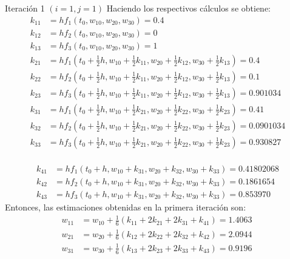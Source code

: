 \begin{frame}{Iteración 1 $(i=1, j=1)$}
Haciendo los respectivos cálculos se obtiene:
\begin{align*}
k_{11} &= hf_1(t_0, w_{10}, w_{20}, w_{30})=0.4\\
k_{12} &= hf_2(t_0, w_{10}, w_{20}, w_{30})=0\\
k_{13} &= hf_3(t_0, w_{10}, w_{20}, w_{30})=1\\
k_{21} &=hf_1(t_0 +\frac{1}{2}h, w_{10}+\frac{1}{2}k_{11}, w_{20}+\frac{1}{2}k_{12}, w_{30}+\frac{1}{2}k_{13})=0.4\\
k_{22} &=hf_2(t_0 +\frac{1}{2}h, w_{10}+\frac{1}{2}k_{11}, w_{20}+\frac{1}{2}k_{12}, w_{30}+\frac{1}{2}k_{13})=0.1\\
k_{23} &=hf_3(t_0 +\frac{1}{2}h, w_{10}+\frac{1}{2}k_{11}, w_{20}+\frac{1}{2}k_{12}, w_{30}+\frac{1}{2}k_{13})=0.901034\\
k_{31}&=hf_1(t_0+\frac{1}{2}h, w_{10}+\frac{1}{2}k_{21}, w_{20}+\frac{1}{2}k_{22}, w_{30}+\frac{1}{2}k_{23})=0.41\\
k_{32}&=hf_2(t_0+\frac{1}{2}h, w_{10}+\frac{1}{2}k_{21}, w_{20}+\frac{1}{2}k_{22}, w_{30}+\frac{1}{2}k_{23})=0.0901034\\
k_{33}&=hf_3(t_0+\frac{1}{2}h, w_{10}+\frac{1}{2}k_{21}, w_{20}+\frac{1}{2}k_{22}, w_{30}+\frac{1}{2}k_{23})=0.930827\\
\end{align*}
\end{frame}


\begin{frame}
\begin{align*}
k_{41} &= hf_1(t_0+h, w_{10}+k_{31}, w_{20}+k_{32}, w_{30}+k_{33})=0.41802068\\
k_{42} &= hf_2(t_0+h, w_{10}+k_{31}, w_{20}+k_{32}, w_{30}+k_{33})=0.1861654\\
k_{43} &= hf_3(t_0+h, w_{10}+k_{31}, w_{20}+k_{32}, w_{30}+k_{33})=0.853970
\end{align*}
Entonces, las estimaciones obtenidas en la primera iteración son:
\begin{align*}
w_{11}&=w_{10}+\frac{1}{6}(k_{11}+2k_{21}+2k_{31}+k_{41})=1.4063\\
w_{21}&=w_{20}+\frac{1}{6}(k_{12}+2k_{22}+2k_{32}+ k_{42})=2.0944\\
w_{31}&=w_{30}+\frac{1}{6}(k_{13}+2k_{23}+2k_{33}+ k_{43})=0.9196\
\end{align*}
\end{frame}

